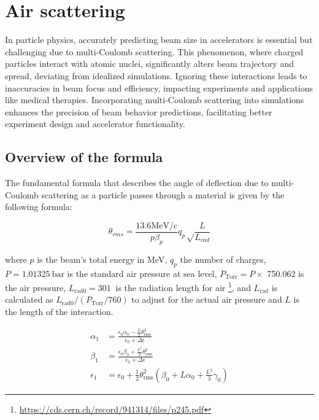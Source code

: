 \documentclass[a4paper,
               biblatex,     %
               ]{jacow}
\begin{document}
\section{Air scattering}

In particle physics, accurately predicting beam size in accelerators is essential but challenging due to multi-Coulomb scattering. This phenomenon, where charged particles interact with atomic nuclei, significantly alters beam trajectory and spread, deviating from idealized simulations. Ignoring these interactions leads to inaccuracies in beam focus and efficiency, impacting experiments and applications like medical therapies. Incorporating multi-Coulomb scattering into simulations enhances the precision of beam behavior predictions, facilitating better experiment design and accelerator functionality.

\subsection{Overview of the formula}

The fundamental formula that describes the angle of deflection due to multi-Coulomb scattering as a particle passes through a material is given by the following formula:

\[
\theta_{rms} = \frac{13.6 \text{MeV/c}}{p\beta_{p}}q_{p}\sqrt\frac{L}{L_{rad}}\]

where $p$ is the beam's total energy in MeV, $q_{p}$ the number of charges, $P = \SI{1.01325}{\bar}$ is the standard air pressure at sea level, $P_{\text{Torr}} = P \times$ \SI{750.062}{\torr} is the air pressure, $L_{\text{rad0}} = \SI{301}{}$ is the radiation length for air \footnote{\href{https://cds.cern.ch/record/941314/files/p245.pdf}{{https://cds.cern.ch/record/941314/files/p245.pdf}}}, and $L_{\text{rad}}$ is calculated as $L_{\text{rad0}}/(P_{\text{Torr}}/760)$ to adjust for the actual air pressure and $L$ is the length of the interaction.


\begin{equation}
\begin{aligned}
\alpha_{1} &= \frac{\epsilon_0 \alpha_0 - \frac{L}{2} \theta_{\text{rms}}^2}{\epsilon_0 + \Delta \epsilon}\\
\beta_{1} &= \frac{\epsilon_0 \beta_0 + \frac{L^2}{3} \theta_{\text{rms}}^2}{\epsilon_0 + \Delta \epsilon}\\
\epsilon_{1} &= \epsilon_0 + \frac{1}{2} \theta_{\text{rms}}^2 \left( \beta_0 + L \alpha_0 + \frac{L^2}{3} \gamma_0 \right)
\end{aligned}
\end{equation}
\end{document}
